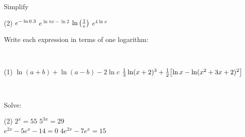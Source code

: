 \documentclass[mathNotesPreamble]{subfiles}
\begin{document}
  \begin{ex*}
    Simplify
  \end{ex*}
  \begin{extasks}[after-item-skip=\stretch{1}](2)
    \task $e\inv[\ln 0.3]$
    \task $e^{\ln \pi x-\ln 2}$
    \task $\ln\parens{\frac{1}{e}}$
    \task $e^{4\ln x}$
  \end{extasks}

  \pagebreak
  \begin{ex*}
    Write each expression in terms of one logarithm:
    
    \noindent
    \begin{minipage}[t]{0.55\linewidth}~
      \begin{extasks}[after-item-skip=2.25in](1)
        \task $\ln(a+b)+\ln(a-b)-2\ln c$
        \task $\frac{1}{3}\ln(x+2)^3 +\frac{1}{2}\sbrkt{\ln x-\ln(x^2+3x+2)^2}$
      \end{extasks}
    \end{minipage}%
    \begin{minipage}[t]{0.45\linewidth}~
      \begin{flushright}
      \end{flushright}
    \end{minipage}
  \end{ex*}
  \begin{center}
  \end{center}
  \pagebreak
  \begin{ex*}
    Solve:
    \begin{extasks}(2)
      \task $2^x=55$
      \task $5^{3x}=29$\\[40pt]
      \task $e^{2x}-5e^x-14=0$
      \task $4e^{2x}-7e^x=15$\\[40pt]
    \end{extasks}
  \end{ex*}
\end{document}

